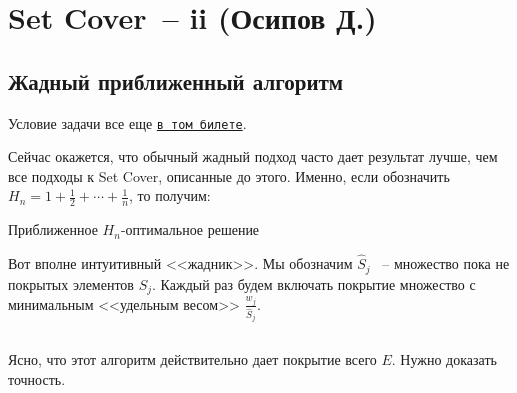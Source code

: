 \section{Set Cover~-- ii (Осипов Д.)}
\subsection{Жадный приближенный алгоритм}
Условие задачи все еще \hyperlink{setcover}{\texttt{в том билете}}.

Сейчас окажется, что обычный жадный подход часто дает результат лучше, чем все подходы к Set Cover, описанные до этого. Именно, если обозначить $H_n = 1 + \frac{1}{2} + \cdots + \frac{1}{n}$, то получим:

\begin{algodescription}{Приближенное $H_n$-оптимальное решение}

Вот вполне интуитивный <<жадник>>. Мы обозначим $\hat{S}_j$ ~-- множество пока не покрытых элементов $S_j$. Каждый раз будем включать покрытие множество с минимальным <<удельным весом>> $\frac{w_j}{\hat{S}_j}$.

\begin{algorithm}[H]
	\DontPrintSemicolon
\end{algorithm}
$ $
\end{algodescription}

Ясно, что этот алгоритм действительно дает покрытие всего $E$. Нужно доказать точность.

